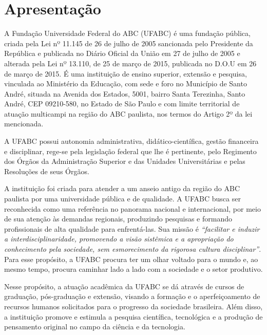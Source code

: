 \section{Apresentação}

A Fundação Universidade Federal do ABC (UFABC) é uma fundação pública, criada
pela Lei nº 11.145 de 26 de julho de 2005 sancionada pelo Presidente da
República e publicada no Diário Oficial da União em 27 de julho de 2005 e
alterada pela Lei nº 13.110, de 25 de março de 2015, publicada no D.O.U em 26
de março de 2015.
É uma instituição de ensino superior, extensão e pesquisa, vinculada ao
Ministério da Educação, com sede e foro no Município de Santo André, situada na
Avenida dos Estados, 5001, bairro Santa Terezinha, Santo André, CEP 09210-580,
no Estado de São Paulo e com limite territorial de atuação multicampi na região
do ABC paulista, nos termos do Artigo 2º da lei mencionada.

A UFABC possui autonomia administrativa, didático-científica, gestão financeira
e disciplinar, rege-se pela legislação federal que lhe é pertinente, pelo
Regimento dos Órgãos da Administração Superior e das Unidades Universitárias e
pelas Resoluções de seus Órgãos.

A instituição foi criada para atender a um anseio antigo da região do ABC
paulista por uma universidade pública e de qualidade.
A UFABC busca ser reconhecida como uma referência no panorama nacional e
internacional, por meio de sua atenção às demandas regionais, produzindo
pesquisas e formando profissionais de alta qualidade para enfrentá-las.
Sua missão é \textit{``facilitar e induzir a interdisciplinaridade, promovendo
a visão sistêmica e a apropriação do conhecimento pela sociedade, sem
esmorecimento da rigorosa cultura disciplinar''}.
Para esse propósito, a UFABC procura ter um olhar voltado para o mundo e, ao
mesmo tempo, procura caminhar lado a lado com a sociedade e o setor produtivo.

Nesse propósito, a atuação acadêmica da UFABC se dá através de cursos de
graduação, pós-graduação e extensão, visando a formação e o aperfeiçoamento de
recursos humanos solicitados para o progresso da sociedade brasileira.
Além disso, a instituição promove e estimula a pesquisa científica, tecnológica
e a produção de pensamento original no campo da ciência e da tecnologia.

